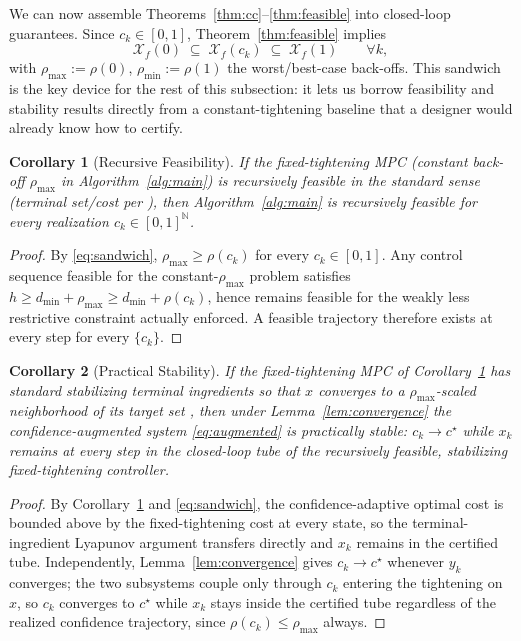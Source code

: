 \documentclass[letterpaper, 10 pt, conference]{ieeeconf}
\newtheorem{corollary}{Corollary}
\begin{document}
We can now assemble Theorems~\ref{thm:cc}--\ref{thm:feasible} into closed-loop guarantees. Since $c_k\in[0,1]$, Theorem~\ref{thm:feasible} implies
\begin{equation}
\mathcal X_f(0) \;\subseteq\; \mathcal X_f(c_k) \;\subseteq\; \mathcal X_f(1) \qquad \forall k, \label{eq:sandwich}
\end{equation}
with $\rho_{\max}:=\rho(0)$, $\rho_{\min}:=\rho(1)$ the worst/best-case back-offs. This sandwich is the key device for the rest of this subsection: it lets us borrow feasibility and stability results directly from a constant-tightening baseline that a designer would already know how to certify.

\begin{corollary}[Recursive Feasibility]
\label{cor:feasibility}
If the fixed-tightening MPC (constant back-off $\rho_{\max}$ in Algorithm~\ref{alg:main}) is recursively feasible in the standard sense (terminal set/cost per \cite{rawlings2020model}), then Algorithm~\ref{alg:main} is recursively feasible for every realization $c_k\in[0,1]^{\mathbb N}$.
\end{corollary}
\begin{proof}
By \eqref{eq:sandwich}, $\rho_{\max}\ge\rho(c_k)$ for every $c_k\in[0,1]$. Any control sequence feasible for the constant-$\rho_{\max}$ problem satisfies $h\ge d_{\min}+\rho_{\max}\ge d_{\min}+\rho(c_k)$, hence remains feasible for the weakly less restrictive constraint actually enforced. A feasible trajectory therefore exists at every step for every $\{c_k\}$.
\end{proof}

\begin{corollary}[Practical Stability]
\label{cor:stability}
If the fixed-tightening MPC of Corollary~\ref{cor:feasibility} has standard stabilizing terminal ingredients so that $x$ converges to a $\rho_{\max}$-scaled neighborhood of its target set \cite{rawlings2020model}, then under Lemma~\ref{lem:convergence} the confidence-augmented system \eqref{eq:augmented} is practically stable: $c_k\to c^\star$ while $x_k$ remains at every step in the closed-loop tube of the recursively feasible, stabilizing fixed-tightening controller.
\end{corollary}
\begin{proof}
By Corollary~\ref{cor:feasibility} and \eqref{eq:sandwich}, the confidence-adaptive optimal cost is bounded above by the fixed-tightening cost at every state, so the terminal-ingredient Lyapunov argument transfers directly and $x_k$ remains in the certified tube. Independently, Lemma~\ref{lem:convergence} gives $c_k\to c^\star$ whenever $y_k$ converges; the two subsystems couple only through $c_k$ entering the tightening on $x$, so $c_k$ converges to $c^\star$ while $x_k$ stays inside the certified tube regardless of the realized confidence trajectory, since $\rho(c_k)\le\rho_{\max}$ always.
\end{proof}
\end{document}
